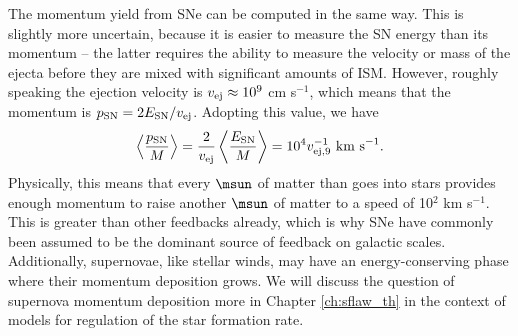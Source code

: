 The momentum yield from SNe can be computed in the same way. This is slightly more uncertain, because it is easier to measure the SN energy than its momentum -- the latter requires the ability to measure the velocity or mass of the ejecta before they are mixed with significant amounts of ISM. However, roughly speaking the ejection velocity is $v_{\rm ej} \approx 10^9$ cm s$^{-1}$, which means that the momentum is $p_{\rm SN} = 2 E_{\rm SN}/v_{\rm ej}$. Adopting this value, we have
\begin{equation}
\left\langle \frac{p_{\rm SN}}{M}\right\rangle = \frac{2}{v_{\rm ej}} \left\langle \frac{E_{\rm SN}}{M}\right\rangle = 10^4 v_{\rm ej,9}^{-1} \mbox{ km s}^{-1}.
\end{equation}
Physically, this means that every $\msun$ of matter than goes into stars provides enough momentum to raise another $\msun$ of matter to a speed of 10$^2$ km s$^{-1}$. This is greater than other feedbacks already, which is why SNe have commonly been assumed to be the dominant source of feedback on galactic scales.  Additionally, supernovae, like stellar winds, may have an energy-conserving phase where their momentum deposition grows. We will discuss the question of supernova momentum deposition more in Chapter \ref{ch:sflaw_th} in the context of models for regulation of the star formation rate.
